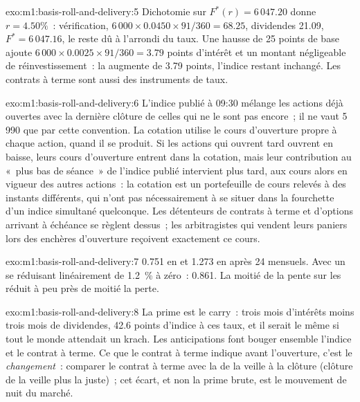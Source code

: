 \begin{solution}{exo:m1:basis-roll-and-delivery:5}
Dichotomie sur $F^*(r) = 6\,047.20$ donne $r = 4.50\%$~: vérification, $6\,000 \times
0.0450 \times 91/360 = 68.25$, dividendes 21.09, $F^* = 6\,047.16$, le reste
dû à l'arrondi du taux. Une hausse de 25 points de base ajoute $6\,000 \times
0.0025 \times 91/360 = 3.79$ points d'intérêt et un montant négligeable de
réinvestissement~: la  augmente de 3.79 points, l'indice restant inchangé.
Les contrats à terme sont aussi des instruments de taux.
\end{solution}

\begin{solution}{exo:m1:basis-roll-and-delivery:6}
L'indice publié à 09:30 mélange les actions déjà ouvertes avec la
dernière clôture de celles qui ne le sont pas encore~; il ne vaut 5\,990 que par cette convention.
La cotation utilise le cours d'ouverture propre à chaque action, quand il se produit. Si
les actions qui ouvrent tard ouvrent en baisse, leurs cours d'ouverture entrent dans la
cotation, mais leur contribution au «~plus bas de séance~» de l'indice publié
intervient plus tard, aux cours alors en vigueur des autres actions~: la cotation est un
portefeuille de cours relevés à des instants différents, qui n'ont pas nécessairement à se situer dans la
fourchette d'un indice simultané quelconque. Les détenteurs de contrats à terme et d'options
arrivant à échéance se règlent dessus~; les arbitragistes qui vendent leurs paniers lors des
enchères d'ouverture reçoivent exactement ce cours.
\end{solution}

\begin{solution}{exo:m1:basis-roll-and-delivery:7}
0.751 en  et 1.273 en  après 24  mensuels. Avec un
 se réduisant linéairement de 1.2~\% à zéro~: 0.861. La moitié de la pente sur les
 réduit à peu près de moitié la perte.
\end{solution}

\begin{solution}{exo:m1:basis-roll-and-delivery:8}
La prime est le carry~: trois mois d'intérêts moins trois mois de
dividendes, 42.6 points d'indice à ces taux, et il serait le même si tout le monde
attendait un krach. Les anticipations font bouger ensemble l'indice et le contrat à terme. Ce
que le contrat à terme indique avant l'ouverture, c'est le \emph{changement}~: comparer le
contrat à terme avec la  de la veille à la clôture (clôture de la veille plus la
 juste)~; cet écart, et non la prime brute, est le mouvement de nuit
du marché.
\end{solution}

